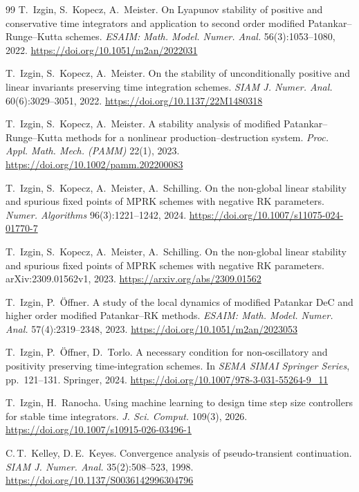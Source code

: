 \documentclass[11pt,a4paper]{article}
\theoremstyle{plain}
\theoremstyle{definition}
\begin{document}
\begin{thebibliography}{99}
T.~Izgin, S.~Kopecz, A.~Meister.
On Lyapunov stability of positive and conservative time integrators and application to second order modified Patankar--Runge--Kutta schemes.
\emph{ESAIM: Math. Model. Numer. Anal.} 56(3):1053--1080, 2022.
\url{https://doi.org/10.1051/m2an/2022031}

T.~Izgin, S.~Kopecz, A.~Meister.
On the stability of unconditionally positive and linear invariants preserving time integration schemes.
\emph{SIAM J. Numer. Anal.} 60(6):3029--3051, 2022.
\url{https://doi.org/10.1137/22M1480318}

T.~Izgin, S.~Kopecz, A.~Meister.
A stability analysis of modified Patankar--Runge--Kutta methods for a nonlinear production--destruction system.
\emph{Proc. Appl. Math. Mech. (PAMM)} 22(1), 2023.
\url{https://doi.org/10.1002/pamm.202200083}

T.~Izgin, S.~Kopecz, A.~Meister, A.~Schilling.
On the non-global linear stability and spurious fixed points of MPRK schemes with negative RK parameters.
\emph{Numer. Algorithms} 96(3):1221--1242, 2024.
\url{https://doi.org/10.1007/s11075-024-01770-7}

T.~Izgin, S.~Kopecz, A.~Meister, A.~Schilling.
On the non-global linear stability and spurious fixed points of MPRK schemes with negative RK parameters.
arXiv:2309.01562v1, 2023.
\url{https://arxiv.org/abs/2309.01562}

T.~Izgin, P.~\"Offner.
A study of the local dynamics of modified Patankar DeC and higher order modified Patankar--RK methods.
\emph{ESAIM: Math. Model. Numer. Anal.} 57(4):2319--2348, 2023.
\url{https://doi.org/10.1051/m2an/2023053}

T.~Izgin, P.~\"Offner, D.~Torlo.
A necessary condition for non-oscillatory and positivity preserving time-integration schemes.
In \emph{SEMA SIMAI Springer Series}, pp.~121--131. Springer, 2024.
\url{https://doi.org/10.1007/978-3-031-55264-9_11}

T.~Izgin, H.~Ranocha.
Using machine learning to design time step size controllers for stable time integrators.
\emph{J. Sci. Comput.} 109(3), 2026.
\url{https://doi.org/10.1007/s10915-026-03496-1}

C.\,T.~Kelley, D.\,E.~Keyes.
Convergence analysis of pseudo-transient continuation.
\emph{SIAM J. Numer. Anal.} 35(2):508--523, 1998.
\url{https://doi.org/10.1137/S0036142996304796}


\end{thebibliography}
\end{document}
